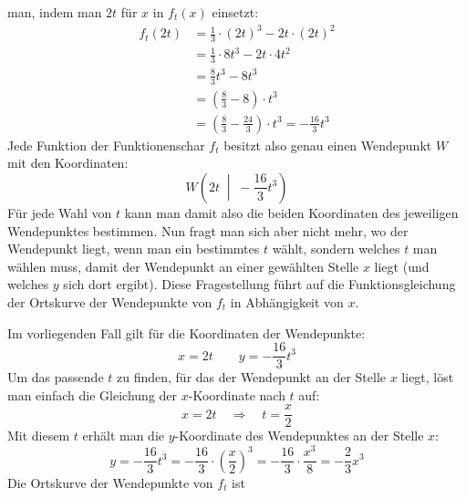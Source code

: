 \begin{exercise}
    man, indem man $2t$ für $x$ in $f_t(x)$
    einsetzt:
    \begin{equation*}
      \begin{split}
        f_t(2t)&=\frac{1}{3}\cdot(2t)^3-2t\cdot(2t)^2
        \\[1ex]
        &=\frac{1}{3}\cdot8t^3-2t\cdot4t^2
        \\[1ex]
        &=\frac{8}{3}t^3-8t^3
        \\[1ex]
        &=\left(\frac{8}{3}-8\right)\cdot t^3
        \\[1ex]
        &=\left(\frac{8}{3}-\frac{24}{3}\right)\cdot t^3
         =-\frac{16}{3}t^3
      \end{split}
    \end{equation*}
    Jede Funktion der Funktionenschar $f_t$ besitzt
    also genau einen Wendepunkt $W$ mit den
    Koordinaten:
    \begin{equation*}
      W\left(2t\;\middle|\;-\frac{16}{3}t^3\right)
    \end{equation*}
    Für jede Wahl von $t$ kann man damit also die
    beiden Koordinaten des jeweiligen Wendepunktes
    bestimmen.
    Nun fragt man sich aber nicht mehr, wo der
    Wendepunkt liegt, wenn man ein bestimmtes
    $t$ wählt, sondern welches $t$ man wählen
    muss, damit der Wendepunkt an einer
    gewählten Stelle $x$ liegt (und welches
    $y$ sich dort ergibt).
    Diese Fragestellung führt auf die
    Funktionsgleichung der Ortskurve der
    Wendepunkte von $f_t$ in Abhängigkeit
    von $x$.
    \par
    Im vorliegenden Fall gilt für die
    Koordinaten der Wendepunkte:
    \begin{equation*}
      x=2t
      \qquad
      y=-\frac{16}{3}t^3
    \end{equation*}
    Um das passende $t$ zu finden, für das
    der Wendepunkt an der Stelle $x$ liegt,
    löst man einfach die Gleichung der
    $x$-Ko\-or\-di\-na\-te nach $t$ auf:
    \begin{equation*}
      x=2t
      \quad\Rightarrow\quad
      t=\frac{x}{2}
    \end{equation*}
    Mit diesem $t$ erhält man die $y$-Koordinate
    des Wendepunktes an der Stelle $x$:
    \begin{equation*}
      y=-\frac{16}{3}t^3
       =-\frac{16}{3}\cdot\left(\frac{x}{2}\right)^3
       =-\frac{16}{3}\cdot\frac{x^3}{8}
       =-\frac{2}{3}x^3
    \end{equation*}
    Die Ortskurve der Wendepunkte von $f_t$ ist

\end{exercise}
